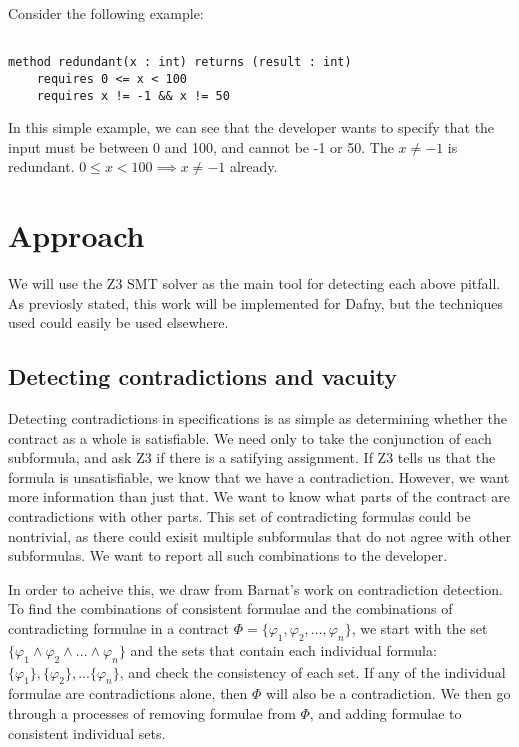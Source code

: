 \documentclass{article}
\begin{document}
Consider the following example:

\begin{lstlisting}

method redundant(x : int) returns (result : int)
    requires 0 <= x < 100
    requires x != -1 && x != 50

\end{lstlisting}

In this simple example, we can see that the developer wants to specify that the input must be between 0 and 100, and cannot be
-1 or 50. The \(x \neq -1\) is redundant. \(0 \leq x < 100 \implies x \neq -1\) already.

\section{Approach}

We will use the Z3 SMT solver as the main tool for detecting each above pitfall. As previosly stated,
this work will be implemented for Dafny, but the techniques used could easily be used elsewhere.

\subsection*{Detecting contradictions and vacuity}

Detecting contradictions in specifications is as simple as determining whether the contract as a whole is satisfiable.
We need only to take the conjunction of each subformula, and ask Z3 if there is a satifying assignment. If Z3 tells us that the
formula is unsatisfiable, we know that we have a contradiction. However, we want more information than just that. We
want to know what parts of the contract are contradictions with other parts. This set of contradicting formulas could be
nontrivial, as there could exisit multiple subformulas that do not agree with other subformulas. We want to report all
such combinations to the developer.

In order to acheive this, we draw from Barnat's \cite{barnat2016analysing} work on contradiction detection.
To find the combinations of consistent formulae and the combinations of contradicting formulae in a contract
\(\Phi = \{\varphi_{1}, \varphi_{2}, ..., \varphi_{n}\}\), we start with the set \(\{\varphi_{1} \land \varphi_{2} \land ... \land \varphi_{n}\} \)
and the sets that contain each individual formula: \(\{\varphi_{1}\}, \{\varphi_{2}\}, ... \{\varphi_{n}\} \), and check
the consistency of each set. If any of the individual formulae are contradictions alone, then \(\Phi\) will also be a contradiction.
We then go through a processes of removing formulae from \(\Phi\), and adding formulae to consistent individual sets.
\end{document}
